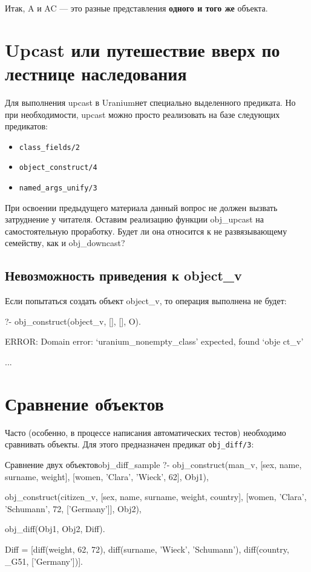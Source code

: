 \documentclass[a4paper]{book}
\def\ur{Uranium}
\begin{document}
Итак, A и AC --- это разные представления {\bf одного и того же}
объекта.

\section{Upcast или путешествие вверх по лестнице наследования}
\label{upcast}

Для выполнения upcast в \ur нет специально выделенного
предиката. Но при необходимости, upcast можно просто реализовать
на базе следующих предикатов:

\begin{itemize}
\item \verb|class_fields/2|
\item \verb|object_construct/4|
\item \verb|named_args_unify/3|
\end{itemize}


При освоении предыдущего материала данный вопрос не должен
вызвать затруднение у читателя. Оставим реализацию функции
obj_upcast на самостоятельную проработку. Будет ли она относится
к не развязывающему семейству, как и obj_downcast?

\subsection{Невозможность приведения к object_v}
Если попытаться создать объект object_v, то операция выполнена не
будет: 

\begin{example}{}{}
?- obj_construct(object_v, [], [], O).

ERROR: Domain error: `uranium_nonempty_class' expected, found `obje
ct_v'                                                             
\end{example}

...

\section{Сравнение объектов}
\label{obj_diff}

Часто (особенно, в процессе написания автоматических тестов)
необходимо сравнивать объекты. Для этого предназначен предикат
\verb|obj_diff/3|:

\begin{example}{Сравнение двух объектов}{obj_diff_sample}
?- obj_construct(man_v, 
      [sex, name, surname, weight], 
      [women, 'Clara', 'Wieck', 62], Obj1), 
   
   obj_construct(citizen_v, 
      [sex, name, surname, weight, country], 
      [women, 'Clara', 'Schumann', 72, ['Germany']], Obj2), 

   obj_diff(Obj1, Obj2, Diff).

Diff = [diff(weight, 62, 72), diff(surname, 'Wieck', 'Schumann'), diff(country, _G51, ['Germany'])].
\end{example}
\end{document}
